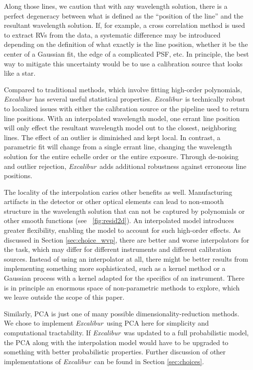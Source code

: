 \documentclass[modern]{aastex63}
\newcommand{\project}[1]{\textsl{#1}}
\newcommand{\name}{\project{Excalibur}}
\begin{document}
Along those lines, we caution that with any wavelength solution, there is a perfect degeneracy between what is defined as the ``position of the line'' and the resultant wavelength solution.  If, for example, a cross correlation method is used to extract RVs from the data, a systematic difference may be introduced depending on the definition of what exactly is the line position, whether it be the center of a Gaussian fit, the edge of a complicated PSF, etc.  In principle, the best way to mitigate this uncertainty would be to use a calibration source that looks like a star.

Compared to traditional methods, which involve fitting high-order polynomials, \name\ has several useful statistical properties.  \name\ is technically robust to localized issues with either the calibration source or the pipeline used to return line positions.  With an interpolated wavelength model, one errant line position will only effect the resultant wavelength model out to the closest, neighboring lines.  The effect of an outlier is diminished and kept local.  In contrast, a parametric fit will change from a single errant line, changing the wavelength solution for the entire echelle order or the entire exposure.  Through de-noising and outlier rejection, \name\ adds additional robustness against erroneous line positions.

The locality of the interpolation caries other benefits as well.  Manufacturing artifacts in the detector or other optical elements can lead to non-smooth structure in the wavelength solution that can not be captured by polynomials or other smooth functions (see \figurename~\ref{fig:resid2d}).  An interpolated model introduces greater flexibility, enabling the model to account for such high-order effects.  As discussed in Section \ref{sec:choice_wvp}, there are better and worse interpolators for the task, which may differ for different instruments and different calibration sources.  Instead of using an interpolator at all, there might be better results from implementing something more sophisticated, such as a kernel method or a Gaussian process with a kernel adapted for the specifics of an instrument.  There is in principle an enormous space of non-parametric methods to explore, which we leave outside the scope of this paper.

Similarly, PCA is just one of many possible dimensionality-reduction methods.  We chose to implement \name\ using PCA here for simplicity and computational tractability.  If \name\ was updated to a full probabilistic model, the PCA along with the interpolation model would have to be upgraded to something with better probabilistic properties.  Further discussion of other implementations of \name\ can be found in Section \ref{sec:choices}.
\end{document}
